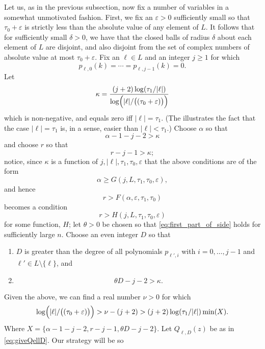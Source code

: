 \documentclass{memo-l}
\theoremstyle{plain}
\theoremstyle{definition}
\numberwithin{section}{chapter}
\numberwithin{equation}{chapter}
\theoremstyle{plain}
\theoremstyle{definition}
\begin{document}
Let us, as in the previous subsection, now fix a number of variables in a
somewhat unmotivated fashion.  First, we fix an \( \varepsilon>0 \)
sufficiently small so that \( \tau_0+\varepsilon \) is strictly less than
the absolute value of any element of \( L \).  It follows that for
sufficiently small \( \delta>0 \), we have that the closed balls of radius
\( \delta \) about each element of \( L \) are disjoint, and also disjoint
from the set of complex numbers of absolute value at most \(
\tau_0+\varepsilon \).  Fix an \( \ell\in L \) and an integer \( j\geq 1 \)
for which \[ p_{\ell,0}(k) = \cdots = p_{\ell,j-1}(k)=0.  \] Let \[ \kappa
=
\frac{(j+2)\log(\tau_1/|\ell|)}{\log\Bigl(|\ell|/\bigl((\tau_0+\varepsilon)\bigr)
\Bigr)} \] which is non-negative, and equals zero iff \( |\ell|=\tau_1 \).
(The illustrates the fact that the case \( |\ell|=\tau_1 \) is, in a sense,
easier than \( |\ell|<\tau_1 \).) Choose \( \alpha \) so that
\begin{equation}\label{eq:givealpha2} \alpha-1-j-2 > \kappa \end{equation}
and choose \( r \) so that \begin{equation}\label{eq:giver2} r-j-1 > \kappa
; \end{equation} 
notice, since $\kappa$ is a function of $j,|\ell|,\tau_1,\tau_0,\varepsilon$
that the above conditions are of the form
$$
\alpha\ge G(j,L,\tau_1,\tau_0,\varepsilon),
$$
and hence
$$
r > F(\alpha,\varepsilon,\tau_1,\tau_0)
$$
becomes a condition
$$
r > H(j,L,\tau_1,\tau_0,\varepsilon)
$$
for some function, $H$;
let \( \theta>0 \) be chosen so that
\eqref{eq:first_part_of_side} holds for sufficiently large \( n \).  Choose
an even integer \( D \) so that \begin{enumerate} \item \( D \) is greater
than the degree of all polynomials \( p_{\ell',i} \) with \( i=0,\ldots,j-1
\) and \( \ell'\in L\setminus\{\ell\} \), and \item
\begin{equation}\label{eq:giveD} \theta D-j-2 > \kappa .  \end{equation}
\end{enumerate} Given the above, we can find a real number \( \nu>0 \) for
which \begin{equation}\label{eq:givenu}
\log\Bigl(|\ell|/\bigl((\tau_0+\varepsilon)\bigr) \Bigr) > \nu - (j+2)
> (j+2)\log(\tau_1/|\ell|) \min(X).
\end{equation} Where \( X = \{ \alpha-1-j-2,r-j-1,\theta D-j-2 \} \). Let
\( Q_{\ell,D}(z) \) be as in \eqref{eq:giveQellD}.  Our strategy will be so
\end{document}
